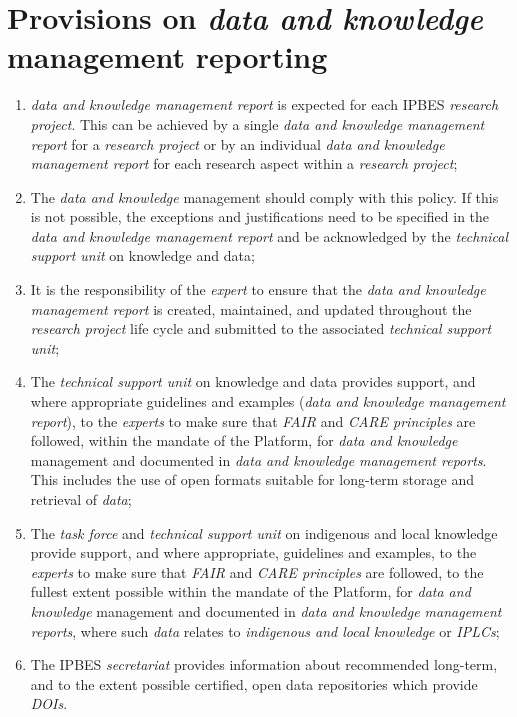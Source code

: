 \documentclass{article}
\begin{document}
\section{Provisions on \textit{data and knowledge} management reporting}

\begin{enumerate}[label=(\alph*)]
    \item \textit{data and knowledge management report} is expected for each IPBES \textit{research project}. This can be achieved by a single \textit{data and knowledge management report} for a \textit{research project} or by an individual \textit{data and knowledge management report} for each research aspect within a \textit{research project};

    \item The \textit{data and knowledge }management should comply with this policy. If this is not possible, the exceptions and justifications need to be specified in the \textit{data and knowledge management report} and be acknowledged by the \textit{technical support unit} on knowledge and data;

    \item It is the responsibility of the \textit{expert }to ensure that the \textit{data and knowledge management report} is created, maintained, and updated throughout the \textit{research project }life cycle and submitted to the associated\textit{ technical support unit};

    \item The \textit{technical support unit} on knowledge and data provides support, and where appropriate guidelines and examples (\textit{data and knowledge management report}), to the \textit{experts }to make sure that \textit{FAIR }and\textit{ CARE principles} are followed, within the mandate of the Platform, for \textit{data and knowledge }management and documented in \textit{data and knowledge management reports}. This includes the use of open formats suitable for long-term storage and retrieval of \textit{data};

    \item The \textit{task force} and \textit{technical support unit} on indigenous and local knowledge provide support, and where appropriate, guidelines and examples, to the \textit{experts }to make sure that \textit{FAIR} and \textit{CARE principles} are followed, to the fullest extent possible within the mandate of the Platform, for \textit{data and knowledge }management and documented in \textit{data and knowledge management reports}, where such \textit{data} relates to \textit{indigenous and local knowledge} or\textit{ IPLCs};

    \item The IPBES \textit{secretariat }provides information about recommended long-term, and to the extent possible certified, open data repositories which provide \textit{DOIs}.
\end{enumerate}
\end{document}
